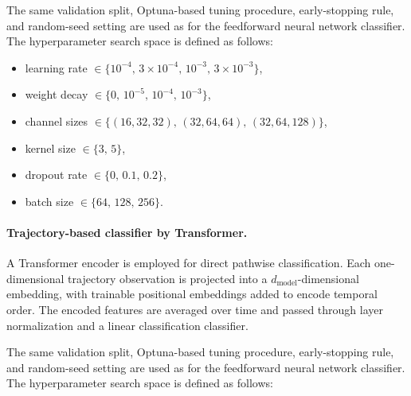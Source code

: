 \documentclass{article}
\theoremstyle{plain}
\theoremstyle{definition}
\theoremstyle{remark}
\begin{document}
The same validation split, Optuna-based tuning procedure, early-stopping rule, and random-seed setting are used as for the feedforward neural network classifier. 
The hyperparameter search space is defined as follows:

\begin{itemize}

    \item learning rate $\in \{10^{-4},\, 3\times10^{-4},\, 10^{-3},\, 3\times10^{-3}\}$,

    \item weight decay $\in\{0,\, 10^{-5},\, 10^{-4},\, 10^{-3}\}$,

    \item channel sizes $\in\{(16,32,32),\, (32,64,64),\, (32,64,128)\}$,

    \item kernel size $\in\{3,\,5\}$,

    \item dropout rate $\in\{0,\,0.1,\,0.2\}$,

    \item batch size $\in\{64,\,128,\,256\}$.

\end{itemize}

\paragraph{Trajectory-based classifier by Transformer.}
A Transformer encoder is employed for direct pathwise classification.
Each one-dimensional trajectory observation is projected into a $d_{\mathrm{model}}$-dimensional embedding, with trainable positional embeddings added to encode temporal order.
The encoded features are averaged over time and passed through layer normalization and a linear classification classifier.

The same validation split, Optuna-based tuning procedure, early-stopping rule, and random-seed setting are used as for the feedforward neural network classifier. 
The hyperparameter search space is defined as follows:
\end{document}
